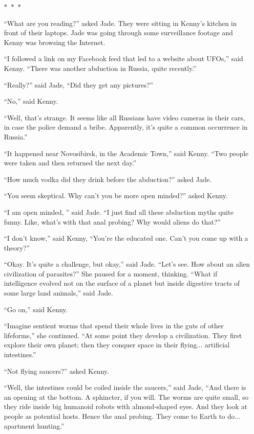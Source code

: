 \documentclass{memoir}
\newcommand{\starbreak}{%
\begin{center}
  $\ast$~$\ast$~$\ast$
\end{center}
}
\begin{document}
\starbreak

``What are you reading?'' asked Jade. They were sitting in Kenny's kitchen in front of their laptops. Jade was going through some surveillance footage and Kenny was browsing the Internet. 

``I followed a link on my Facebook feed that led to a website about UFOs,'' said Kenny. ``There was another abduction in Russia, quite recently.''

``Really?'' said Jade, ``Did they get any pictures?''

``No,'' said Kenny.

``Well, that's strange. It seems like all Russians have video cameras in their cars, in case the police demand a bribe. Apparently, it's quite a common occurrence in Russia.''

``It happened near Novosibirsk, in the Academic Town,'' said Kenny. ``Two people were taken and then returned the next day.''

``How much vodka did they drink before the abduction?'' asked Jade. 

``You seem skeptical. Why can't you be more open minded?'' asked Kenny.

``I am open minded, '' said Jade. ``I just find all these abduction myths quite funny. Like, what's with that anal probing? Why would aliens do that?''

``I don't know,'' said Kenny, ``You're the educated one. Can't you come up with a theory?''

``Okay. It's quite a challenge, but okay,'' said Jade. ``Let's see. How about an alien civilization of parasites?'' She paused for a moment, thinking. ``What if intelligence evolved not on the surface of a planet but inside digestive tracts of some large land animals,'' said Jade.

``Go on,'' said Kenny.

``Imagine sentient worms that spend their whole lives in the guts of other lifeforms,'' she continued. ``At some point they develop a civilization. They first explore their own planet; then they conquer space in their flying... artificial intestines.''

``Not flying saucers?'' asked Kenny.

``Well, the intestines could be coiled inside the saucers,'' said Jade, ``And there is an opening at the bottom. A sphincter, if you will. The worms are quite small, so they ride inside big humanoid robots with almond-shaped eyes. And they look at people as potential hosts. Hence the anal probing. They come to Earth to do... apartment hunting.''
\end{document}
